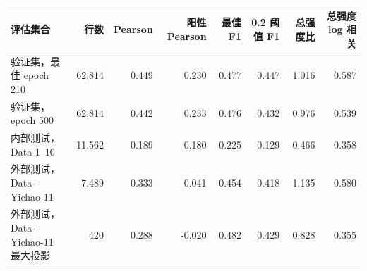 \begin{tabular}{@{}lrrrrrrr@{}}
\toprule
评估集合 & 行数 & Pearson & 阳性 Pearson & 最佳 F1 & 0.2 阈值 F1 & 总强度比 & 总强度 log 相关 \\
\midrule
验证集，最佳 epoch 210 & 62,814 & 0.449 & 0.230 & 0.477 & 0.447 & 1.016 & 0.587 \\
验证集，epoch 500 & 62,814 & 0.442 & 0.233 & 0.476 & 0.432 & 0.976 & 0.539 \\
内部测试，Data 1--10 & 11,562 & 0.189 & 0.180 & 0.225 & 0.129 & 0.466 & 0.358 \\
外部测试，Data-Yichao-11 & 7,489 & 0.333 & 0.041 & 0.454 & 0.418 & 1.135 & 0.580 \\
外部测试，Data-Yichao-11 最大投影 & 420 & 0.288 & -0.020 & 0.482 & 0.429 & 0.828 & 0.355 \\
\bottomrule
\end{tabular}
